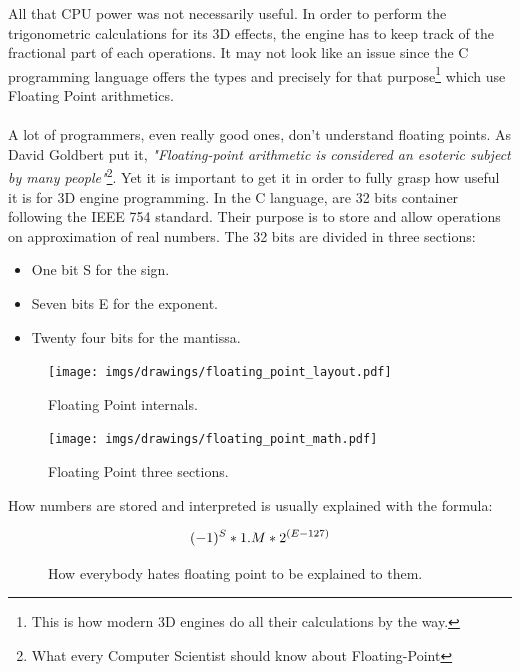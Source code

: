 \documentclass[book.tex]{subfiles}
\begin{document}
   All that CPU power was not necessarily useful. In order to perform the trigonometric calculations for its 3D effects, the engine has to keep track of the fractional part of each operations. It may not look like an issue since the C programming language offers the types  and  precisely for that purpose\footnote{This is how modern 3D engines do all their calculations by the way.} which use Floating Point arithmetics.\\
\\
A lot of programmers, even really good ones, don't understand floating points. As David Goldbert put it, \emph{"Floating-point arithmetic is considered an esoteric subject by many people"}\footnote{What every Computer Scientist should know about Floating-Point}. Yet it is  important to get it in order to fully grasp how useful it is for 3D engine programming. In the C language,  are 32 bits container following the IEEE 754 standard. Their purpose is to store and allow operations on approximation of real numbers. The 32 bits are divided in three sections:\\
\begin{itemize}
  \item One bit S for the sign.
  \item Seven bits E for the exponent.
  \item Twenty four bits for the mantissa.
\end{itemize} 

\begin{figure}[H]
\centering
\texttt{[image: imgs/drawings/floating\_point\_layout.pdf]}
\caption{Floating Point internals.}
\end{figure}
  \bigskip



\begin{figure}[H]
\centering
\texttt{[image: imgs/drawings/floating\_point\_math.pdf]}
\caption{Floating Point three sections.}
\end{figure}
  \bigskip  


How numbers are stored and interpreted is usually explained with the formula:\\
\par
\begin{figure}[H]
\begin{equation}\label{eq:fp}
\large
(-1)^S * 1.M * 2^{(E-127)}
\end{equation}
 \caption{How everybody hates floating point to be explained to them.}
\end{figure}
\bigskip  
\end{document}

